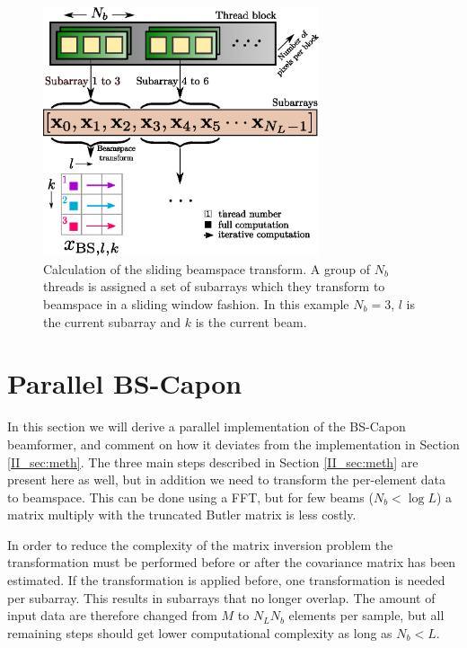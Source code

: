 \begin{figure}
\centerline{\includegraphics[width=3.2in]{gfx/gpu_layout_bs_2.eps}}
\caption{Calculation of the sliding beamspace transform. A group of $N_b$ threads is assigned a set of subarrays which they transform to beamspace in a sliding window fashion. In this example $N_b=3$, $l$ is the current subarray and $k$ is the current beam.}
\label{II_fig:gpulayoutbs}
\end{figure}

\section{Parallel BS-Capon}\label{II_sec:bs}

In this section we will derive a parallel implementation of the BS-Capon beamformer, and comment on how it deviates from the implementation in Section \ref{II_sec:meth}. The three main steps described in Section \ref{II_sec:meth} are present here as well, but in addition we need to transform the per-element data to beamspace. This can be done using a FFT, but for few beams ($N_b < \log{L}$) a matrix multiply with the truncated Butler matrix is less costly. 

In order to reduce the complexity of the matrix inversion problem the transformation must be performed before or after the covariance matrix has been estimated. If the transformation is applied before, one transformation is needed per subarray. This results in subarrays that no longer overlap. The amount of input data are therefore changed from $M$ to $N_LN_b$ elements per sample, but all remaining steps should get lower computational complexity as long as $N_b < L$.

